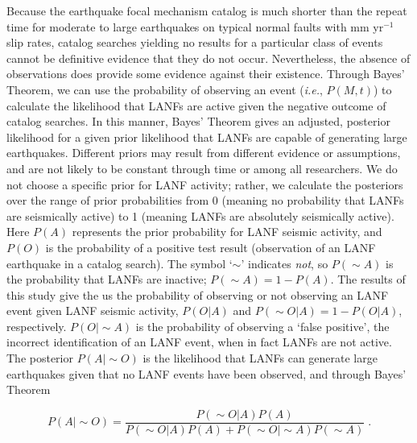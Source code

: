 \documentclass[draft,grl]{AGUTeX}
\begin{document}
\begin{article}
Because the earthquake focal mechanism catalog is much shorter than the repeat
time for moderate to large earthquakes on typical normal faults with mm
yr$^{-1}$ slip rates, catalog searches yielding no results for a particular
class of events cannot be definitive evidence that they do not occur.
Nevertheless, the absence of observations does provide some evidence against
their existence. Through Bayes' Theorem, we can use the probability of
observing an event (\emph{i.e.}, $P(M,t)$) to calculate the likelihood that
LANFs are active given the negative outcome of catalog searches. In this
manner, Bayes' Theorem gives an adjusted, posterior likelihood for a given
prior likelihood that LANFs are capable of generating large earthquakes.
Different priors may result from different evidence or assumptions, and are not
likely to be constant through time or among all researchers. We do not choose
a specific prior for LANF activity; rather, we calculate the posteriors over
the range of prior probabilities from 0 (meaning no probability that LANFs are
seismically active) to 1 (meaning LANFs are absolutely seismically active).
Here $P(A)$ represents the prior probability for LANF seismic activity, and
$P(O)$ is the probability of a positive test result (observation of an LANF
earthquake in a catalog search).  The symbol `$\sim$' indicates \emph{not}, so
$P(\sim A)$ is the probability that LANFs are inactive;  $ P(\sim A)
= 1 - P(A)$.  The results of this study give the us the probability of
observing or not observing an LANF event given LANF seismic activity, $P(O|A)$
and $P(\sim O | A) = 1 - P(O|A)$, respectively. $P(O | \sim A)$ is the
probability of observing a `false positive', the incorrect identification of an
LANF event, when in fact LANFs are not active.  The posterior $P(A |\sim O)$ is
the likelihood that LANFs can generate large earthquakes given that no LANF
events have been observed, and through Bayes' Theorem

\begin{equation}
P(A | \sim O) = \frac{P(\sim O|A) P(A)}
{P(\sim O|A)P(A) + P(\sim O|\sim A)P(\sim A)} \;.
\label{BayesRule}
\end{equation}


\end{article}
\end{document}

